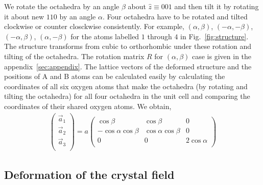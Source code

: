 \documentclass[a4paper,prb,twocolumn]{revtex4-1}  %
\newcommand{\com}[1]{}
\newcommand{\az}[1]{{\color{magenta}{#1}}} %
\begin{document}
We rotate the octahedra by an angle $\beta$ about $\hat z \equiv 001$
and then tilt it by rotating it about new $110$ by an angle $\alpha$.
Four octahedra have to be rotated and tilted clockwise or counter closckwise
consistently. For example, %
$(\alpha,\beta)$,
$(-\alpha,-\beta)$,
$(-\alpha,\beta)$,
$(\alpha,-\beta)$
for the atoms labelled $1$ through $4$ in Fig.~\ref{fig:structure}.
The structure transforms from cubic to orthorhombic under these rotation and tilting of the octahedra.
The rotation matrix $R$ for $(\alpha,\beta)$ case is given in the appendix~\ref{sec:appendix}. 
The lattice vectors of the deformed structure and the positions of A and B atoms can be calculated easily by calculating the coordinates of all six oxygen atoms that make the octahedra (by rotating and tilting the octahedra) for all four octahedra in the unit cell and 
comparing the coordinates of their shared oxygen atoms.
We obtain,
\begin{align}
\left(
\begin{array}{c}
\vec a_1 \\
\vec a_2\\
\vec a_3\\
\end{array}
\right)
= a
\left(
\begin{array}{ccc}
 \cos \beta  & \cos \beta  & 0 \\
 -\cos \alpha  \cos \beta  & \cos \alpha  \cos \beta  & 0 \\
 0 & 0 & 2 \cos \alpha  \\
\end{array}
\right)
\end{align}


\com{
\begin{align}
\vec a_1 & =  \cos\beta ( 1,1,0 ) ,\\
\vec a_2 & =  \cos\alpha  \cos\beta(-1,1,0 ),\\
\vec a_3 & =  \cos\alpha ( 0,0,2 ).
\end{align}
}





\subsection{Deformation of the crystal field}
\label{sec:deformCF}

\end{document}
